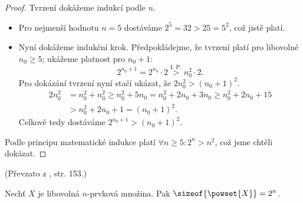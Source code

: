 \begin{proof}
    Tvrzení dokážeme indukcí podle $n$.
    \begin{itemize}
        \item Pro nejmenší hodnotu $n=5$ dostáváme $2^5=32>25=5^2$, což jistě platí.
        \item Nyní dokážeme indukční krok. Předpokládejme, že tvrzení platí pro libovolné $n_0\geq 5$; ukážeme platnost pro $n_0+1$:
        \begin{equation*}
            2^{n_0+1}=2^{n_0}\cdot 2\stackrel{\text{I. P.}}{>} n_0^2 \cdot 2.
        \end{equation*}
        Pro dokázání tvrzení nyní stačí ukázat, že $2n_0^2 > (n_0+1)^2$.
        \begin{align*}
            2n_0^2 &= n_0^2+n_0^2\geq n_0^2+5n_0=n_0^2+2n_0+3n_0\geq n_0^2+2n_0+15\\
            &>n_0^2+2n_0+1=(n_0+1)^2.
        \end{align*}
        Celkově tedy dostáváme $2^{n_0+1}>(n_0+1)^2$.
    \end{itemize}
    Podle principu matematické indukce platí $\forall n\geq 5: 2^n>n^2$, což jsme chtěli dokázat.
\end{proof}
(Převzato z \cite{ChartrandPolimeniZhang2014}, str. 153.)
\begin{proposition}
    Nechť $X$ je libovolná $n$-prvková množina. Pak $\sizeof{\powset{X}}=2^n$.
\end{proposition}
